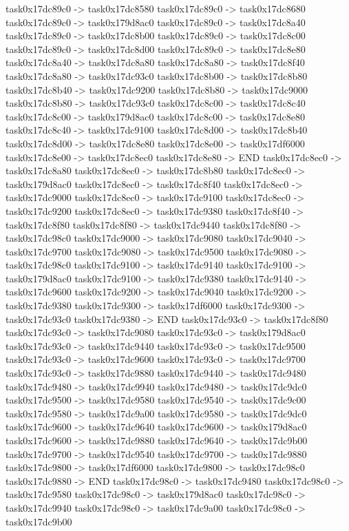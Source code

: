{	task0x17dc89c0 -> task0x17dc8580
	task0x17dc89c0 -> task0x17dc8680
	task0x17dc89c0 -> task0x179d8ac0
	task0x17dc89c0 -> task0x17dc8a40
	task0x17dc89c0 -> task0x17dc8b00
	task0x17dc89c0 -> task0x17dc8c00
	task0x17dc89c0 -> task0x17dc8d00
	task0x17dc89c0 -> task0x17dc8e80
	task0x17dc8a40 -> task0x17dc8a80
	task0x17dc8a80 -> task0x17dc8f40
	task0x17dc8a80 -> task0x17dc93c0
	task0x17dc8b00 -> task0x17dc8b80
	task0x17dc8b40 -> task0x17dc9200
	task0x17dc8b80 -> task0x17dc9000
	task0x17dc8b80 -> task0x17dc93c0
	task0x17dc8c00 -> task0x17dc8c40
	task0x17dc8c00 -> task0x179d8ac0
	task0x17dc8c00 -> task0x17dc8e80
	task0x17dc8c40 -> task0x17dc9100
	task0x17dc8d00 -> task0x17dc8b40
	task0x17dc8d00 -> task0x17dc8e80
	task0x17dc8e00 -> task0x17df6000
	task0x17dc8e00 -> task0x17dc8ec0
	task0x17dc8e80 -> END
	task0x17dc8ec0 -> task0x17dc8a80
	task0x17dc8ec0 -> task0x17dc8b80
	task0x17dc8ec0 -> task0x179d8ac0
	task0x17dc8ec0 -> task0x17dc8f40
	task0x17dc8ec0 -> task0x17dc9000
	task0x17dc8ec0 -> task0x17dc9100
	task0x17dc8ec0 -> task0x17dc9200
	task0x17dc8ec0 -> task0x17dc9380
	task0x17dc8f40 -> task0x17dc8f80
	task0x17dc8f80 -> task0x17dc9440
	task0x17dc8f80 -> task0x17dc98c0
	task0x17dc9000 -> task0x17dc9080
	task0x17dc9040 -> task0x17dc9700
	task0x17dc9080 -> task0x17dc9500
	task0x17dc9080 -> task0x17dc98c0
	task0x17dc9100 -> task0x17dc9140
	task0x17dc9100 -> task0x179d8ac0
	task0x17dc9100 -> task0x17dc9380
	task0x17dc9140 -> task0x17dc9600
	task0x17dc9200 -> task0x17dc9040
	task0x17dc9200 -> task0x17dc9380
	task0x17dc9300 -> task0x17df6000
	task0x17dc9300 -> task0x17dc93c0
	task0x17dc9380 -> END
	task0x17dc93c0 -> task0x17dc8f80
	task0x17dc93c0 -> task0x17dc9080
	task0x17dc93c0 -> task0x179d8ac0
	task0x17dc93c0 -> task0x17dc9440
	task0x17dc93c0 -> task0x17dc9500
	task0x17dc93c0 -> task0x17dc9600
	task0x17dc93c0 -> task0x17dc9700
	task0x17dc93c0 -> task0x17dc9880
	task0x17dc9440 -> task0x17dc9480
	task0x17dc9480 -> task0x17dc9940
	task0x17dc9480 -> task0x17dc9dc0
	task0x17dc9500 -> task0x17dc9580
	task0x17dc9540 -> task0x17dc9c00
	task0x17dc9580 -> task0x17dc9a00
	task0x17dc9580 -> task0x17dc9dc0
	task0x17dc9600 -> task0x17dc9640
	task0x17dc9600 -> task0x179d8ac0
	task0x17dc9600 -> task0x17dc9880
	task0x17dc9640 -> task0x17dc9b00
	task0x17dc9700 -> task0x17dc9540
	task0x17dc9700 -> task0x17dc9880
	task0x17dc9800 -> task0x17df6000
	task0x17dc9800 -> task0x17dc98c0
	task0x17dc9880 -> END
	task0x17dc98c0 -> task0x17dc9480
	task0x17dc98c0 -> task0x17dc9580
	task0x17dc98c0 -> task0x179d8ac0
	task0x17dc98c0 -> task0x17dc9940
	task0x17dc98c0 -> task0x17dc9a00
	task0x17dc98c0 -> task0x17dc9b00
}
